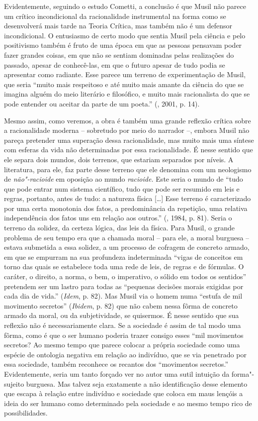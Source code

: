 Evidentemente, seguindo o estudo Cometti, a conclusão é que Musil não
parece um crítico incondicional da racionalidade instrumental na forma
como se desenvolverá mais tarde na Teoria Crítica, mas também não é um
defensor incondicional. O entusiasmo de certo modo que sentia Musil pela
ciência e pelo positivismo também é fruto de uma época em que as pessoas
pensavam poder fazer grandes coisas, em que não se sentiam dominadas
pelas realizações do passado, apesar de conhecê-las, em que o futuro
apesar de tudo podia se apresentar como radiante. Esse parece um terreno
de experimentação de Musil, que seria ``muito mais respeitoso e até
muito mais amante da ciência do que se imagina alguém do meio literário
e filosófico, e muito mais racionalista do que se pode entender ou
aceitar da parte de um poeta.'' (, 2001, p. 14).

Mesmo assim, como veremos, a obra é também uma grande reflexão crítica
sobre a racionalidade moderna -- sobretudo por meio do narrador --,
embora Musil não pareça pretender uma superação dessa racionalidade, mas
muito mais uma síntese com esferas da vida não determinadas por essa
racionalidade. É nesse sentido que ele separa dois mundos, dois
terrenos, que estariam separados por níveis. A literatura, para ele, faz
parte desse terreno que ele denomina com um neologismo de
\emph{não"-racioide} em oposição ao mundo \emph{racioide.} Este seria o
mundo de ``tudo que pode entrar num sistema científico, tudo que pode
ser resumido em leis e regras, portanto, antes de tudo: a natureza
física [\ldots{}] Esse terreno é caracterizado por uma certa
monotonia dos fatos, a predominância da repetição, uma relativa
independência dos fatos uns em relação aos outros.'' (, 1984, p.
81). Seria o terreno da solidez, da certeza lógica, das leis da física.
Para Musil, o grande problema de seu tempo era que a chamada moral --
para ele, a moral burguesa -- estava submetida a essa solidez, a um
processo de cofragem de concreto armado, em que se empurram na sua
profundeza indeterminada ``vigas de conceitos em torno das quais se
estabelece toda uma rede de leis, de regras e de fórmulas. O caráter, o
direito, a norma, o bem, o imperativo, o sólido em todos os sentidos''
pretendem ser um lastro para todas as ``pequenas decisões morais
exigidas por cada dia de vida.'' (\emph{Idem}, p. 82). Mas Musil via o
homem numa ``estufa de mil movimento secretos'' (\emph{Ibidem}, p. 82)
que não cabem nessa fôrma de concreto armado da moral, ou da
subjetividade, se quisermos. É nesse sentido que sua reflexão não é
necessariamente clara. Se a sociedade é assim de tal modo uma fôrma,
como é que o ser humano poderia trazer consigo esses ``mil movimentos
secretos? Ao mesmo tempo que parece colocar a própria sociedade como uma
espécie de ontologia negativa em relação ao indivíduo, que se via
penetrado por essa sociedade, também reconhece os recantos dos
``movimentos secretos.'' Evidentemente, seria um tanto forçado ver no
autor uma sutil intuição da forma"-sujeito burguesa. Mas talvez seja
exatamente a não identificação desse elemento que escapa à relação entre
indivíduo e sociedade que coloca em maus lençóis a ideia do ser humano
como determinado pela sociedade e ao mesmo tempo rico de possibilidades.

